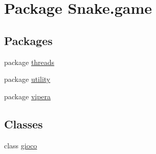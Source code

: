 \hypertarget{namespace_snake_1_1game}{}\section{Package Snake.\+game}
\label{namespace_snake_1_1game}
\subsection*{Packages}
\begin{DoxyCompactItemize}
\item 
package \mbox{\hyperlink{namespace_snake_1_1game_1_1threads}{threads}}
\item 
package \mbox{\hyperlink{namespace_snake_1_1game_1_1utility}{utility}}
\item 
package \mbox{\hyperlink{namespace_snake_1_1game_1_1vipera}{vipera}}
\end{DoxyCompactItemize}
\subsection*{Classes}
\begin{DoxyCompactItemize}
\item 
class \mbox{\hyperlink{class_snake_1_1game_1_1gioco}{gioco}}
\end{DoxyCompactItemize}

